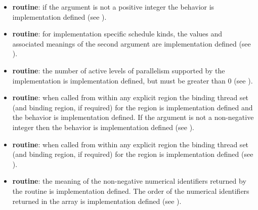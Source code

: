 \begin{itemize}
\item {} \textbf{routine}: if the argument is not a 
      positive integer the behavior is implementation defined 
      (see ).
\item {} \textbf{routine}: for implementation specific 
      schedule kinds, the values and associated meanings of the second argument 
      are implementation defined (see ).
\item {} \textbf{routine}: the number
      of active levels of parallelism supported by the implementation is
      implementation defined, but must be greater than 0 (see
      ).
\item {} \textbf{routine}: when called from 
      within any explicit  region the binding thread set 
      (and binding region, if required) for the  
      region is implementation defined and the behavior is implementation defined. 
      If the argument is not a non-negative integer then the behavior is 
      implementation defined (see ).
\item {} \textbf{routine}: when called from within 
      any explicit  region the binding thread set (and binding 
      region, if required) for the  region is 
       implementation defined (see ).
\item {} \textbf{routine}: the meaning of the
      non-negative numerical identifiers returned by the 
       routine is implementation defined. The
      order of the numerical identifiers returned in the array  is
      implementation defined (see ).


\end{itemize}
